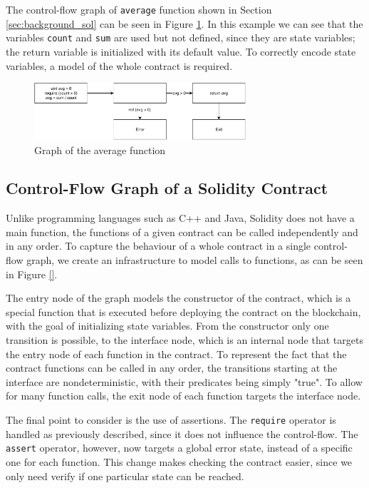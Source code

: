 The control-flow graph of \texttt{average} function shown in Section \ref{sec:background_sol} can be seen in Figure \ref{fig:cfg_average}. In this example we can see that the variables \texttt{count} and \texttt{sum} are used but not defined, since they are state variables; the return variable is initialized with its default value. To correctly encode state variables, a model of the whole contract is required.

\begin{figure}[ht]
	\centering
	\includegraphics[width=0.7\textwidth]{images/average}
	\caption{Graph of the average function}
	\label{fig:cfg_average}
\end{figure}


\subsection{Control-Flow Graph of a Solidity Contract} \label{sec:sol_cfg_con}

Unlike programming languages such as C++ and Java, Solidity does not have a main function, the functions of a given contract can be called independently and in any order. To capture the behaviour of a whole contract in a single control-flow graph, we create an infrastructure to model calls to functions, as can be seen in Figure \ref{}.

The entry node of the graph models the constructor of the contract, which is a special function that is executed before deploying the contract on the blockchain, with the goal of initializing state variables. From the constructor only one transition is possible, to the interface node, which is an internal node that targets the entry node of each function in the contract. To represent the fact that the contract functions can be called in any order, the transitions starting at the interface are nondeterministic, with their predicates being simply "true". To allow for many function calls, the exit node of each function targets the interface node.

The final point to consider is the use of assertions. The \texttt{require} operator is handled as previously described, since it does not influence the control-flow. The \texttt{assert} operator, however, now targets a global error state, instead of a specific one for each function. This change makes checking the contract easier, since we only need verify if one particular state can be reached. 